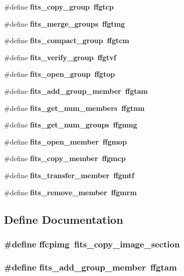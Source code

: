 \begin{CompactItemize}
\item 
\#define \bf{fits\_\-copy\_\-group}~ffgtcp
\item 
\#define \bf{fits\_\-merge\_\-groups}~ffgtmg
\item 
\#define \bf{fits\_\-compact\_\-group}~ffgtcm
\item 
\#define \bf{fits\_\-verify\_\-group}~ffgtvf
\item 
\#define \bf{fits\_\-open\_\-group}~ffgtop
\item 
\#define \bf{fits\_\-add\_\-group\_\-member}~ffgtam
\item 
\#define \bf{fits\_\-get\_\-num\_\-members}~ffgtnm
\item 
\#define \bf{fits\_\-get\_\-num\_\-groups}~ffgmng
\item 
\#define \bf{fits\_\-open\_\-member}~ffgmop
\item 
\#define \bf{fits\_\-copy\_\-member}~ffgmcp
\item 
\#define \bf{fits\_\-transfer\_\-member}~ffgmtf
\item 
\#define \bf{fits\_\-remove\_\-member}~ffgmrm
\end{CompactItemize}


\subsection{Define Documentation}
\subsubsection{\setlength{\rightskip}{0pt plus 5cm}\#define ffcpimg~fits\_\-copy\_\-image\_\-section}\label{test_2roimasker_2longnam_8h_421f404476b1124203a4959cfe5ffa55}


\subsubsection{\setlength{\rightskip}{0pt plus 5cm}\#define fits\_\-add\_\-group\_\-member~ffgtam}\label{test_2roimasker_2longnam_8h_77e070fc3e3583484c9ad06028fd414d}


